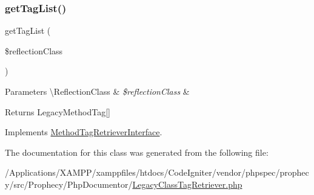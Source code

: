 \subsubsection{\texorpdfstring{get\+Tag\+List()}{getTagList()}}
{\footnotesize\ttfamily get\+Tag\+List (\begin{DoxyParamCaption}\item[{\textbackslash{}Reflection\+Class}]{\$reflection\+Class }\end{DoxyParamCaption})}


\begin{DoxyParams}[1]{Parameters}
\textbackslash{}\+Reflection\+Class & {\em \$reflection\+Class} & \\
\hline
\end{DoxyParams}
\begin{DoxyReturn}{Returns}
Legacy\+Method\+Tag\mbox{[}\mbox{]} 
\end{DoxyReturn}


Implements \mbox{\hyperlink{interface_prophecy_1_1_php_documentor_1_1_method_tag_retriever_interface_a2eb68ce00dcc84a156b9a2b7844a5e6f}{Method\+Tag\+Retriever\+Interface}}.



The documentation for this class was generated from the following file\+:\begin{DoxyCompactItemize}
\item 
/\+Applications/\+X\+A\+M\+P\+P/xamppfiles/htdocs/\+Code\+Igniter/vendor/phpspec/prophecy/src/\+Prophecy/\+Php\+Documentor/\mbox{\hyperlink{_legacy_class_tag_retriever_8php}{Legacy\+Class\+Tag\+Retriever.\+php}}\end{DoxyCompactItemize}
